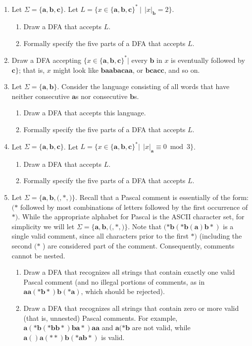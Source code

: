 \begin{enumerate}[{1.}1.]
\item Let $\Sigma=\{\pmb{a},\pmb{b},\pmb{c}\}$. Let $L=\{x\in\{\pmb{a},\pmb{b},
\pmb{c}\}^* \ | \ \ |x|_{\pmb{b}} = 2\}$.
\begin{enumerate}
\item Draw a DFA that accepts $L$.
\item Formally specify the five parts of a DFA that accepts $L$.
\end{enumerate}

\item Draw a DFA accepting $\{x\in\{\pmb{a},\pmb{b},\pmb{c}\}^*|$ every $\pmb{b}$
in $x$ is eventually followed by $\pmb{c}\}$; that is, $x$ might look like
$\pmb{baabacaa}$, or $\pmb{bcacc}$, and so on.

\item Let $\Sigma =\{\pmb{a},\pmb{b}\}$. Consider the language consisting of all
words that have neither consecutive $\pmb{a}$s nor consecutive $\pmb{b}$s.
\begin{enumerate}
\item Draw a DFA that accepts this language.
\item Formally specify the five parts of a DFA that accepts $L$.
\end{enumerate}

\item Let $\Sigma=\{\pmb{a},\pmb{b},\pmb{c}\}$. Let
$L=\{x\in\{\pmb{a},\pmb{b},\pmb{c}\}^*  | \ \ |x|_{\pmb{a}} \equiv 0 \bmod 3\}$.
\begin{enumerate}
\item Draw a DFA that accepts $L$.
\item Formally specify the five parts of a DFA that accepts $L$.
\end{enumerate}

\item Let $\Sigma=\{\pmb{a},\pmb{b},\pmb{(},\pmb{*},\pmb{)}\}$. Recall that a
Pascal comment is essentially of the form: $\pmb{(*}$ followed by most
combinations of letters followed by the first occurrence of $\pmb{*)}$. While
the appropriate alphabet for Pascal is the ASCII character set, for simplicity
we will let $\Sigma=\{\pmb{a},\pmb{b},\pmb{(},\pmb{*},\pmb{)}\}$. Note that
$\pmb{(*b(*b(a)b*)}$ is a single valid comment, since all characters prior to
the first $\pmb{*)}$ (including the second $\pmb{(*}$ ) are considered part of
the comment. Consequently, comments cannot be nested.
\begin{enumerate}
\item Draw a DFA that recognizes all strings that contain exactly one valid
Pascal comment (and no illegal portions of comments, as in $\pmb{aa(*b*)b(*a)}$, which should be rejected).
\item Draw a DFA that recognizes all strings that contain zero or more valid
(that is, unnested) Pascal comments. For example,
$\pmb{a(*b(*bb*)ba*)aa}$ and $\pmb{a(*b}$ are not valid, while
$\pmb{a()a(**)b(*ab*)}$ is valid.
\end{enumerate}


\end{enumerate}
